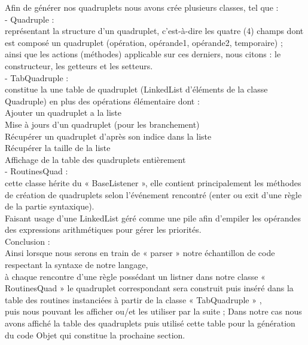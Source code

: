 \documentclass[12pt]{article}
\begin{document}
Afin de générer nos quadruplets nous avons crée plusieurs classes, tel que :\\

\color{blue}
-	Quadruple :\\
\color{black} représentant la structure d'un quadruplet, c'est-à-dire les quatre (4) champs dont est composé un quadruplet (opération, opérande1, opérande2, temporaire) ;\\
 ainsi que les actions (méthodes) applicable sur ces derniers, nous citons : le constructeur, les getteurs et les setteurs.\\
 
\color{blue}
-	TabQuadruple :\\
\color{black} constitue la une table de quadruplet (LinkedList d'éléments de la classe Quadruple) en plus des opérations élémentaire dont :\\

Ajouter un quadruplet a la liste\\
Mise à jours d'un quadruplet (pour les branchement)\\
Récupérer un quadruplet d'après son indice dans la liste\\
Récupérer la taille de la liste\\
Affichage de la table des quadruplets entièrement\\ 

\color{blue}
-	RoutinesQuad :\\
\color{black} cette classe hérite du « BaseListener », elle contient principalement les méthodes de création de quadruplets selon l'événement rencontré (enter ou exit d'une règle de la partie syntaxique).\\
Faisant usage d'une LinkedList géré comme une pile afin d'empiler les opérandes des expressions arithmétiques pour gérer les priorités.\\


\color{red}
 Conclusion :\\
\color{black}
Ainsi lorsque nous serons en train de « parser » notre échantillon de code respectant la syntaxe de notre langage,\\
à chaque rencontre d'une règle  possédant un listner dans notre classe « RoutinesQuad »  le quadruplet correspondant sera construit puis inséré dans la table des routines instanciées à partir de la classe « TabQuadruple » ,\\
 puis nous pouvant les afficher ou/et les utiliser par la suite ;
Dans notre cas nous avons affiché la table des quadruplets puis utilisé cette table pour la génération du code Objet qui constitue la prochaine section.\\
\texttt{}\\
\end{document}

